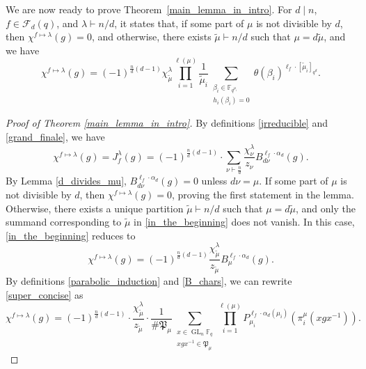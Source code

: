 \documentclass[Unicode,ALCO]{cedram}
\DeclareMathOperator{\GL}{GL}
\newcommand{\F}{\mathbb{F}}
\newcommand{\CF}{\mathcal{F}}
\newcommand{\para}{\mathfrak{P}}
\newcommand{\te}{\theta}
\begin{document}
We are now ready to prove Theorem~\ref{main_lemma_in_intro}.
For \(d \mid n\), \(f \in \CF_d (q)\), and \(\lambda \vdash n/d\), it states that,
if some part of \(\mu\) is not divisible by \(d\), then \(\chi^{f \mapsto \lambda} (g) = 0\), and otherwise, there exists \(\tilde{\mu} \vdash n/d\) such that \(\mu = d \tilde{\mu}\), and we have
\begin{equation}
\chi^{f \mapsto \lambda} (g)
= (-1)^{\tfrac{n}{d}(d-1)}
\chi^\lambda_{\tilde{\mu}}
\prod_{i = 1}^{\ell(\mu)}
\frac{1}{\tilde{\mu}_i}
\sum_{\substack{ \beta_i \in \F_{q^{\mu_i}} \\ h_i(\beta_i) = 0}} \te (\beta_i)^{\ell_f \cdot [\tilde{\mu}_i]_{q^d}}.
\end{equation}



\begin{proof}[Proof of Theorem \ref{main_lemma_in_intro}]
By definitions \eqref{jrreducible} and \eqref{grand_finale}, we have
\begin{equation}
\label{in_the_beginning}
\chi^{f \mapsto \lambda} (g)
= J_f^\lambda (g) = (-1)^{\tfrac{n}{d} (d-1)} \cdot \sum_{\nu \vdash \tfrac{n}{d}} \frac{\chi^\lambda_\nu}{z_\nu} B_{d \nu}^{\ell_f \cdot \alpha_{d}} (g).
\end{equation}
By Lemma \ref{d_divides_mu}, $B_{d \nu}^{\ell_f \cdot \alpha_d} (g) = 0$ unless $d \nu = \mu$.
If some part of $\mu$ is not divisible by $d$, then $\chi^{f \mapsto \lambda}(g) = 0$, proving the first statement in the lemma.
Otherwise, there exists a unique partition \(\tilde{\mu} \vdash n/d\) such that \(\mu = d \tilde{\mu}\),
and only the summand corresponding to \(\tilde{\mu}\) in \eqref{in_the_beginning} does not vanish.
In this case, \eqref{in_the_beginning} reduces to
\begin{equation}
\label{super_concise}
\chi^{f \mapsto \lambda} (g) = (-1)^{\frac{n}{d}(d-1)} \frac{\chi^\lambda_{\tilde{\mu}}}{z_{\tilde{\mu}}} B_{\mu}^{\ell_f \cdot \alpha_d} (g).
\end{equation}
By definitions \eqref{parabolic_induction} and \eqref{B_chars}, we can rewrite \eqref{super_concise} as
\begin{equation}
\label{expandedB_eqn}
\chi^{f \mapsto \lambda} (g)
= (-1)^{\tfrac{n}{d} (d-1)} \cdot \frac{\chi^\lambda_{\tilde{\mu}}}{z_{\tilde{\mu}}} \cdot \frac{1}{\# \para_{\mu}} \sum_{\substack{x \in \GL_n \F_q \\ xgx^{-1} \in \para_{\mu}}} \prod_{i = 1}^{\ell(\mu)} P_{\mu_i}^{\ell_f \cdot \alpha_d (\mu_i)} (\pi^\mu_i (xgx^{-1})).
\end{equation}


\end{proof}
\end{document}
